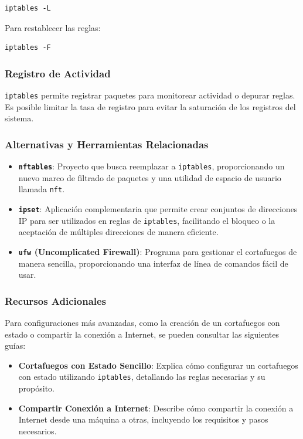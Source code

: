 \begin{verbatim}
iptables -L
\end{verbatim}

Para restablecer las reglas:

\begin{verbatim}
iptables -F
\end{verbatim}

\subsubsection{Registro de Actividad}

\texttt{iptables} permite registrar paquetes para monitorear actividad o depurar reglas. Es posible limitar la tasa de registro para evitar la saturación de los registros del sistema. 
\subsubsection{Alternativas y Herramientas Relacionadas}

\begin{itemize}
    \item \textbf{\texttt{nftables}}: Proyecto que busca reemplazar a \texttt{iptables}, proporcionando un nuevo marco de filtrado de paquetes y una utilidad de espacio de usuario llamada \texttt{nft}. 
    \item \textbf{\texttt{ipset}}: Aplicación complementaria que permite crear conjuntos de direcciones IP para ser utilizados en reglas de \texttt{iptables}, facilitando el bloqueo o la aceptación de múltiples direcciones de manera eficiente. 
    \item \textbf{\texttt{ufw} (Uncomplicated Firewall)}: Programa para gestionar el cortafuegos de manera sencilla, proporcionando una interfaz de línea de comandos fácil de usar. 
\end{itemize}

\subsubsection{Recursos Adicionales}

Para configuraciones más avanzadas, como la creación de un cortafuegos con estado o compartir la conexión a Internet, se pueden consultar las siguientes guías:

\begin{itemize}
    \item \textbf{Cortafuegos con Estado Sencillo}: Explica cómo configurar un cortafuegos con estado utilizando \texttt{iptables}, detallando las reglas necesarias y su propósito. 
    \item \textbf{Compartir Conexión a Internet}: Describe cómo compartir la conexión a Internet desde una máquina a otras, incluyendo los requisitos y pasos necesarios.
\end{itemize}


